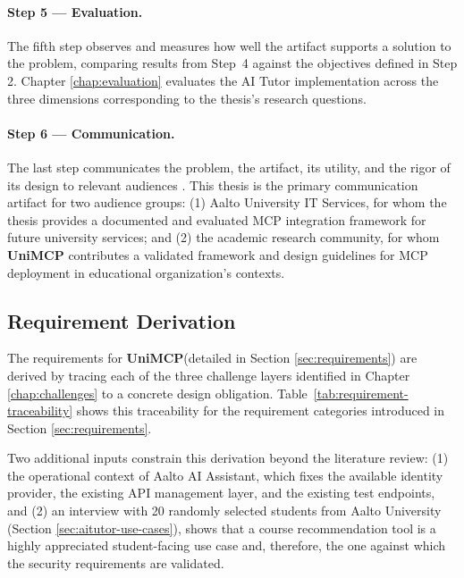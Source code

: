 \documentclass[english, 12pt, a4paper, elec, utf8, a-2b, online]{aaltothesis}
\newcommand{\UniMCP}{\textbf{UniMCP}\xspace}
\begin{document}
\paragraph{Step 5 --- Evaluation.}
The fifth step observes and measures how well the artifact supports a solution to the problem, comparing results from Step~4 against the objectives defined in Step 2.
Chapter \ref{chap:evaluation} evaluates the AI Tutor implementation across the three dimensions corresponding to
the thesis's research questions.

\paragraph{Step 6 --- Communication.}
The last step communicates the problem, the artifact, its utility, and the rigor of its design to relevant
audiences \cite{peffers2007design}.
This thesis is the primary communication artifact for two audience groups: 
(1) Aalto University IT Services, for whom the thesis provides a documented and evaluated MCP integration framework for future university services; and
(2) the academic research community,
for whom \UniMCP contributes a validated framework and
design guidelines for MCP deployment in educational organization's contexts.

\subsection{Requirement Derivation}
\label{sec:rd-req-derivation}

The requirements for \UniMCP (detailed in Section \ref{sec:requirements}) are derived by tracing each of the three challenge layers identified in Chapter \ref{chap:challenges} to a concrete design obligation.
Table~\ref{tab:requirement-traceability} shows this traceability for the requirement categories introduced in Section \ref{sec:requirements}. 

Two additional inputs constrain this derivation beyond the literature review: (1) the operational context of Aalto AI Assistant, which fixes the available identity provider, the existing API management layer, and the existing test endpoints, %
and (2) an interview with 20 randomly selected students from Aalto University (Section \ref{sec:aitutor-use-cases}), shows that a course recommendation tool is a highly appreciated student-facing use case and, therefore, the one against which the security requirements are validated.
\end{document}
